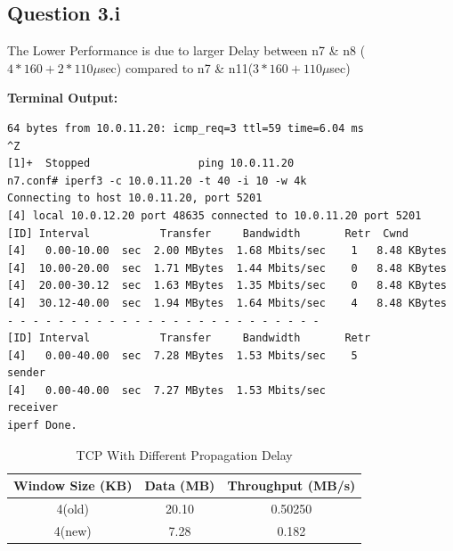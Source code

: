 \documentclass[12pt]{article}
\begin{document}
\subsection{Question 3.i}
The Lower Performance is due to larger Delay between n7 \& n8 ($4*160+2*110\mu$sec) compared to n7 \& n11($3*160+110\mu$sec)
\begin{framed}
    \footnotesize
    \noindent\textbf{Terminal Output:}
    \begin{verbatim}
64 bytes from 10.0.11.20: icmp_req=3 ttl=59 time=6.04 ms
^Z
[1]+  Stopped                 ping 10.0.11.20
n7.conf# iperf3 -c 10.0.11.20 -t 40 -i 10 -w 4k
Connecting to host 10.0.11.20, port 5201
[4] local 10.0.12.20 port 48635 connected to 10.0.11.20 port 5201
[ID] Interval           Transfer     Bandwidth       Retr  Cwnd
[4]   0.00-10.00  sec  2.00 MBytes  1.68 Mbits/sec    1   8.48 KBytes       
[4]  10.00-20.00  sec  1.71 MBytes  1.44 Mbits/sec    0   8.48 KBytes       
[4]  20.00-30.12  sec  1.63 MBytes  1.35 Mbits/sec    0   8.48 KBytes       
[4]  30.12-40.00  sec  1.94 MBytes  1.64 Mbits/sec    4   8.48 KBytes       
- - - - - - - - - - - - - - - - - - - - - - - - -
[ID] Interval           Transfer     Bandwidth       Retr
[4]   0.00-40.00  sec  7.28 MBytes  1.53 Mbits/sec    5             sender
[4]   0.00-40.00  sec  7.27 MBytes  1.53 Mbits/sec                  receiver
iperf Done.
\end{verbatim}
\end{framed}
\begin{table}[H]
    \centering
    \begin{tabular}{|c|c|c|}
        \hline
        \textbf{Window Size (KB)} & \textbf{Data (MB)} & \textbf{Throughput (MB/s)} \\
        \hline

        4(old) & 20.10 & 0.50250 \\
        4(new) & 7.28 & 0.182 \\
        \hline
    \end{tabular}
    \caption{TCP With Different Propagation Delay}
    \label{tab:window_size_data}
\end{table}
\pagebreak
\end{document}
